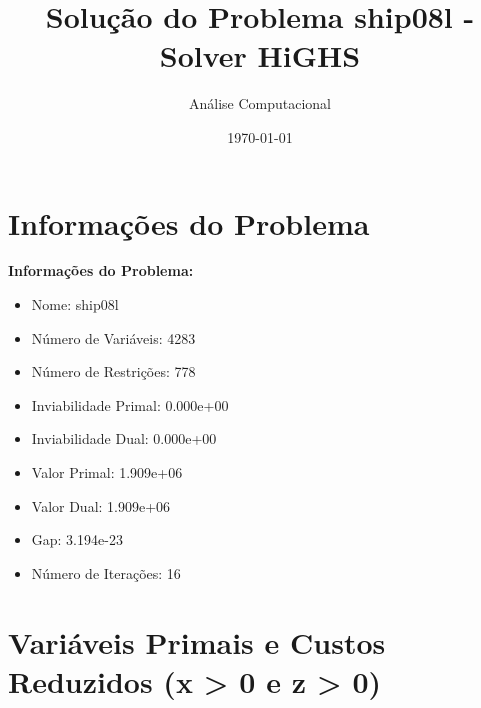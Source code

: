 \documentclass[12pt]{article}
\title{Solução do Problema ship08l - Solver HiGHS}
\author{Análise Computacional}
\date{\today}
\begin{document}
\maketitle

\section{Informações do Problema}

\textbf{Informações do Problema:}
\begin{itemize}
\item Nome: ship08l
\item Número de Variáveis: 4283
\item Número de Restrições: 778
\item Inviabilidade Primal: 0.000e+00
\item Inviabilidade Dual: 0.000e+00
\item Valor Primal: 1.909e+06
\item Valor Dual: 1.909e+06
\item Gap: 3.194e-23
\item Número de Iterações: 16
\end{itemize}


\section{Variáveis Primais e Custos Reduzidos (x > 0 e z > 0)}
\end{document}
